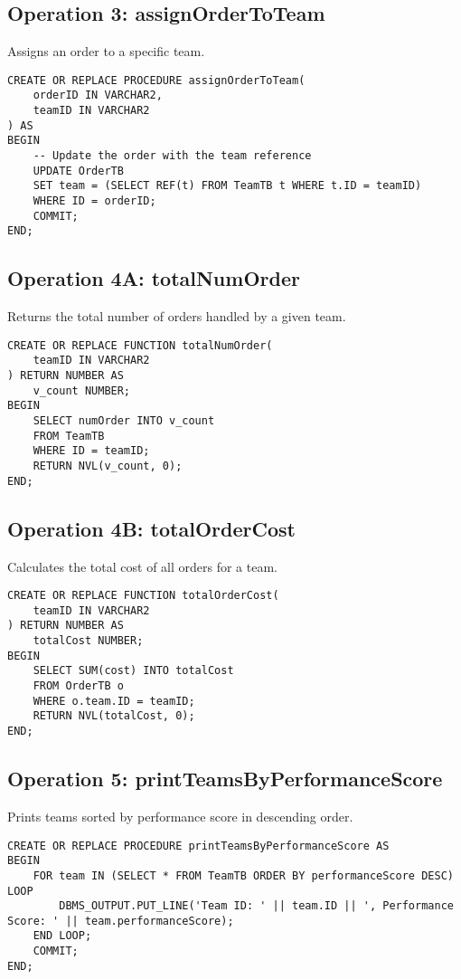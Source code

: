 \subsection*{Operation 3: assignOrderToTeam}
Assigns an order to a specific team.
\begin{lstlisting}
CREATE OR REPLACE PROCEDURE assignOrderToTeam(
    orderID IN VARCHAR2,
    teamID IN VARCHAR2
) AS
BEGIN
    -- Update the order with the team reference
    UPDATE OrderTB
    SET team = (SELECT REF(t) FROM TeamTB t WHERE t.ID = teamID)
    WHERE ID = orderID;
    COMMIT;
END;
\end{lstlisting}

\subsection*{Operation 4A: totalNumOrder}
Returns the total number of orders handled by a given team.
\begin{lstlisting}
CREATE OR REPLACE FUNCTION totalNumOrder(
    teamID IN VARCHAR2
) RETURN NUMBER AS
    v_count NUMBER;
BEGIN
    SELECT numOrder INTO v_count
    FROM TeamTB
    WHERE ID = teamID;
    RETURN NVL(v_count, 0);
END;
\end{lstlisting}

\subsection*{Operation 4B: totalOrderCost}
Calculates the total cost of all orders for a team.
\begin{lstlisting}
CREATE OR REPLACE FUNCTION totalOrderCost(
    teamID IN VARCHAR2
) RETURN NUMBER AS
    totalCost NUMBER;
BEGIN
    SELECT SUM(cost) INTO totalCost
    FROM OrderTB o
    WHERE o.team.ID = teamID;
    RETURN NVL(totalCost, 0);
END;
\end{lstlisting}

\subsection*{Operation 5: printTeamsByPerformanceScore}
Prints teams sorted by performance score in descending order.
\begin{lstlisting}
CREATE OR REPLACE PROCEDURE printTeamsByPerformanceScore AS
BEGIN
    FOR team IN (SELECT * FROM TeamTB ORDER BY performanceScore DESC) LOOP
        DBMS_OUTPUT.PUT_LINE('Team ID: ' || team.ID || ', Performance Score: ' || team.performanceScore);
    END LOOP;
    COMMIT;
END;
\end{lstlisting}
